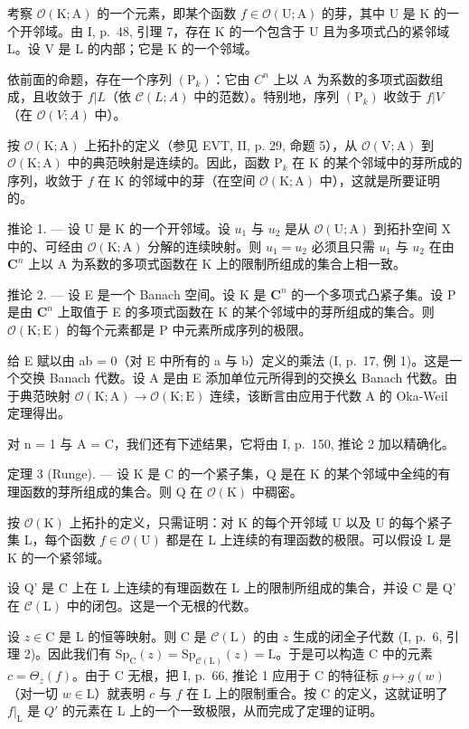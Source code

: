 考察 \(\mathcal{O}(\mathrm{K};\mathrm{A})\) 的一个元素，即某个函数 \(f\in \mathcal{O}(\mathrm{U};\mathrm{A})\) 的芽，其中 U 是 K 的一个开邻域。由 I, p.~48, 引理 7，存在 K 的一个包含于 U 且为多项式凸的紧邻域 L。设 V 是 L 的内部；它是 K 的一个邻域。

依前面的命题，存在一个序列 \((\mathrm{P}_{k})\)：它由 \(C^{n}\) 上以 A 为系数的多项式函数组成，且收敛于 \(f|L\)（依 \(\mathcal{C}(L;A)\) 中的范数）。特别地，序列 \((\mathrm{P}_{k})\) 收敛于 \(f|V\)（在 \(\mathcal{O}(V;A)\) 中）。

按 \(\mathcal{O}(\mathrm{K};\mathrm{A})\) 上拓扑的定义（参见 EVT, II, p. 29, 命题 5），从 \(\mathcal{O}(\mathrm{V};\mathrm{A})\) 到 \(\mathcal{O}(\mathrm{K};\mathrm{A})\) 中的典范映射是连续的。因此，函数 \(\mathrm{P}_k\) 在 K 的某个邻域中的芽所成的序列，收敛于 \(f\) 在 K 的邻域中的芽（在空间 \(\mathcal{O}(\mathrm{K};\mathrm{A})\) 中），这就是所要证明的。

推论 1. --- 设 U 是 K 的一个开邻域。设 \(u_{1}\) 与 \(u_{2}\) 是从 \(\mathcal{O}(\mathrm{U};\mathrm{A})\) 到拓扑空间 X 中的、可经由 \(\mathcal{O}(\mathrm{K};\mathrm{A})\) 分解的连续映射。则 \(u_{1}=u_{2}\) 必须且只需 \(u_{1}\) 与 \(u_{2}\) 在由 \(\mathbf{C}^{n}\) 上以 A 为系数的多项式函数在 K 上的限制所组成的集合上相一致。

推论 2. --- 设 E 是一个 Banach 空间。设 K 是 \(\mathbf{C}^{n}\) 的一个多项式凸紧子集。设 P 是由 \(\mathbf{C}^{n}\) 上取值于 E 的多项式函数在 K 的某个邻域中的芽所组成的集合。则 \(\mathcal{O}(\mathrm{K};\mathrm{E})\) 的每个元素都是 P 中元素所成序列的极限。

给 E 赋以由 ab = 0（对 E 中所有的 a 与 b）定义的乘法 (I, p.~17, 例 1)。这是一个交换 Banach 代数。设 A 是由 E 添加单位元所得到的交换幺 Banach 代数。由于典范映射 \(\mathcal{O}(\mathrm{K};\mathrm{A}) \to \mathcal{O}(\mathrm{K};\mathrm{E})\) 连续，该断言由应用于代数 A 的 Oka-Weil 定理得出。

对 n = 1 与 A = C，我们还有下述结果，它将由 I, p.~150, 推论 2 加以精确化。

定理 3 (Runge). --- 设 K 是 C 的一个紧子集，Q 是在 K 的某个邻域中全纯的有理函数的芽所组成的集合。则 Q 在 \(\mathcal{O}(\mathrm{K})\) 中稠密。

按 \(\mathcal{O}(\mathrm{K})\) 上拓扑的定义，只需证明：对 K 的每个开邻域 U 以及 U 的每个紧子集 L，每个函数 \(f \in \mathcal{O}(\mathrm{U})\) 都是在 L 上连续的有理函数的极限。可以假设 L 是 K 的一个紧邻域。

设 Q' 是 C 上在 L 上连续的有理函数在 L 上的限制所组成的集合，并设 C 是 Q' 在 \(\mathcal{C}(\mathrm{L})\) 中的闭包。这是一个无根的代数。

设 \(z \in \mathrm{C}\) 是 L 的恒等映射。则 C 是 \(\mathcal{C}(\mathrm{L})\) 的由 \(z\) 生成的闭全子代数 (I, p.~6, 引理 2)。因此我们有 \(\mathrm{Sp}_{\mathrm{C}}(z) = \mathrm{Sp}_{\mathcal{C}(\mathrm{L})}(z) = \mathrm{L}\)。于是可以构造 C 中的元素 \(c = \Theta_z(f)\)。由于 C 无根，把 I, p.~66, 推论 1 应用于 C 的特征标 \(g \mapsto g(w)\)（对一切 \(w \in \mathrm{L}\)）就表明 \(c\) 与 \(f\) 在 L 上的限制重合。按 C 的定义，这就证明了 \(f|_{\mathrm{L}}\) 是 \(Q'\) 的元素在 L 上的一个一致极限，从而完成了定理的证明。

